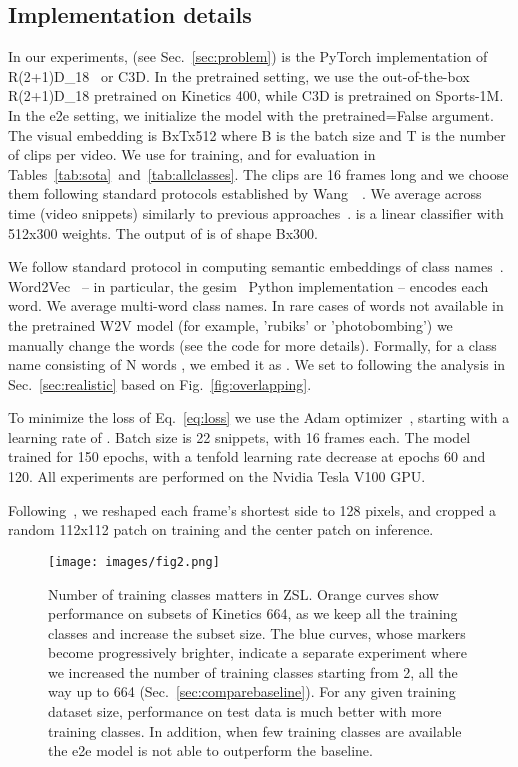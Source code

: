\documentclass[10pt,twocolumn,letterpaper]{article}
\begin{document}
\subsection{Implementation details}
\label{sec:details}
In our experiments,  (see Sec.~\ref{sec:problem}) is the PyTorch implementation of R(2+1)D\_18~\cite{r2plus1d} or C3D\cite{c3d}. In the pretrained setting, we use the out-of-the-box R(2+1)D\_18 pretrained on Kinetics 400\cite{kinetics}, while C3D is pretrained on Sports-1M\cite{sports1m}. In the e2e setting, we initialize the model with the pretrained=False argument. 
The visual embedding  is BxTx512 where B is the batch size and T is the number of clips per video. We use  for training, and  for evaluation in Tables~\ref{tab:sota}~and~\ref{tab:allclasses}. The clips are 16 frames long and we choose them following standard protocols established by Wang~\etal~\cite{tsn}. We average  across time (video snippets) similarly to previous approaches~\cite{c3d, uar}.  is a linear classifier with 512x300 weights. The output of  is of shape Bx300.

We follow standard protocol in computing semantic embeddings of class names~\cite{tarn, xu2015semantic, uar}. Word2Vec~\cite{word2vec} -- in particular, the gesim~\cite{gesim} Python implementation -- encodes each word. We average multi-word class names. In rare cases of words not available in the pretrained W2V model (for example, 'rubiks' or 'photobombing') we manually change the words (see the code for more details). Formally, for a class name consisting of N words , we embed it as . We set  to  following the analysis in Sec.~\ref{sec:realistic} based on Fig.~\ref{fig:overlapping}.

To minimize the loss of Eq.~\ref{eq:loss} we use the Adam optimizer~\cite{adam}, starting with a learning rate of . Batch size is 22 snippets, with 16 frames each. The model trained for 150 epochs, with a tenfold learning rate decrease at epochs 60 and 120. All experiments are performed on the Nvidia Tesla V100 GPU. 

Following~\cite{c3d}, we reshaped each frame's shortest side to 128 pixels, and cropped a random 112x112 patch on training and the center patch on inference. 

\begin{figure}
\centering
\texttt{[image: images/fig2.png]}
\caption{Number of training classes matters in ZSL. Orange curves show performance on subsets of Kinetics 664, as we keep all the training classes and increase the subset size. The blue curves, whose markers become progressively brighter, indicate a separate experiment where we increased the number of training classes starting from 2, all the way up to 664 (Sec.~\ref{sec:comparebaseline}). For any given training dataset size, performance on test data is much better with more training classes. In addition, when few training classes are available the e2e model is not able to outperform the baseline.}
\label{fig:classes}
\end{figure}
\end{document}
